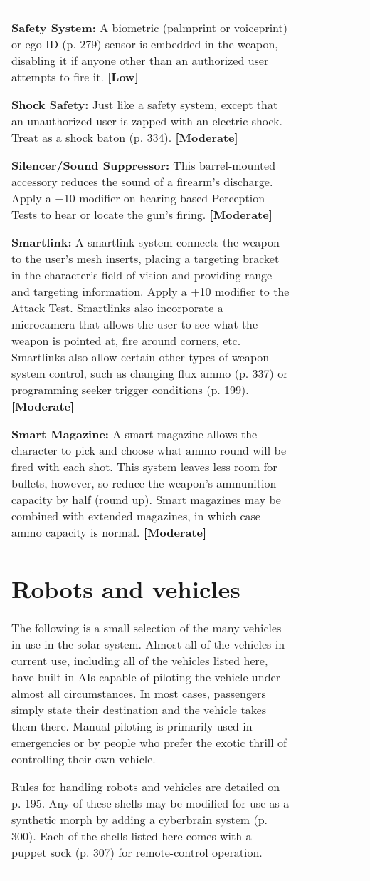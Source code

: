 \begin{tabular}{|l|l|l|l|l|l|l|}
\textbf{Safety System:} A biometric (palmprint or voiceprint) or ego ID (p. 279) sensor is embedded in the weapon, disabling it if anyone other than an authorized user attempts to fire it. \textbf{[Low]} 

\textbf{Shock Safety:} Just like a safety system, except that an unauthorized user is zapped with an electric shock. Treat as a shock baton (p. 334). \textbf{[Moderate]} 

\textbf{Silencer/Sound Suppressor:} This barrel-mounted accessory reduces the sound of a firearm’s discharge. Apply a $-$10 modifier on hearing-based Perception Tests to hear or locate the gun’s firing. \textbf{[Moderate]} 

\textbf{Smartlink:} A smartlink system connects the weapon to the user’s mesh inserts, placing a targeting bracket in the character’s field of vision and providing range and targeting information. Apply a +10 modifier to the Attack Test. Smartlinks also incorporate a microcamera that allows the user to see what the weapon is pointed at, fire around corners, etc. Smartlinks also allow certain other types of weapon system control, such as changing flux ammo (p. 337) or programming seeker trigger conditions (p. 199). \textbf{[Moderate]} 

\textbf{Smart Magazine:} A smart magazine allows the character to pick and choose what ammo round will be fired with each shot. This system leaves less room for bullets, however, so reduce the weapon’s ammunition capacity by half (round up). Smart magazines may be combined with extended magazines, in which case ammo capacity is normal. \textbf{[Moderate]} 

\section{Robots and vehicles} \label{sec:robots-vehicles} 

The following is a small selection of the many vehicles in use in the solar system. Almost all of the vehicles in current use, including all of the vehicles listed here, have built-in AIs capable of piloting the vehicle under almost all circumstances. In most cases, passengers simply state their destination and the vehicle takes them there. Manual piloting is primarily used in emergencies or by people who prefer the exotic thrill of controlling their own vehicle. 

Rules for handling robots and vehicles are detailed on p. 195. Any of these shells may be modified for use as a synthetic morph by adding a cyberbrain system (p. 300). Each of the shells listed here comes with a puppet sock (p. 307) for remote-control operation. 


\end{tabular}
